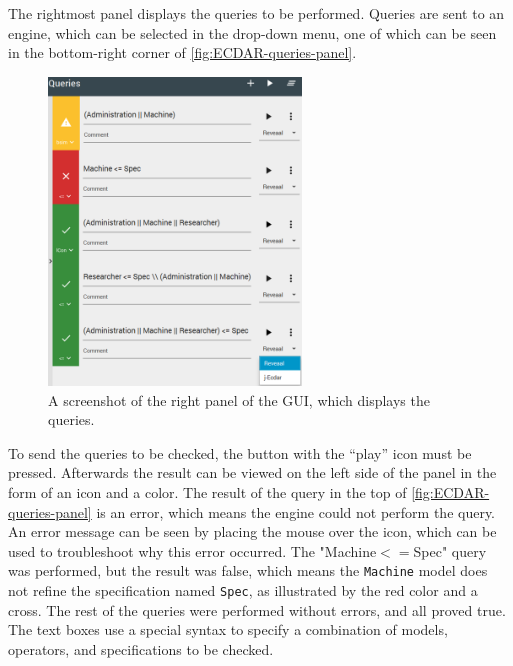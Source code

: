 The rightmost panel displays the queries to be performed. 
Queries are sent to an engine, which can be selected in the drop-down menu, one of which can be seen in the bottom-right corner of \autoref{fig:ECDAR-queries-panel}. 
\begin{figure}[H]
    \centering
    \includegraphics[width=0.6\textwidth]{common/figures/right-panel.png}
    \caption{A screenshot of the right panel of the GUI, which displays the queries.}
    \label{fig:ECDAR-queries-panel}
\end{figure}
To send the queries to be checked, the button with the ``play'' icon must be pressed.
Afterwards the result can be viewed on the left side of the panel in the form of an icon and a color. 
The result of the query in the top of \autoref{fig:ECDAR-queries-panel} is an error, which means the engine could not perform the query. 
An error message can be seen by placing the mouse over the icon, which can be used to troubleshoot why this error occurred.
The "Machine$<=$Spec" query was performed, but the result was false, which means the \texttt{Machine} model does not refine the specification named \texttt{Spec}, as illustrated by the red color and a cross.
The rest of the queries were performed without errors, and all proved true.
The text boxes use a special syntax to specify a combination of models, operators, and specifications to be checked.

